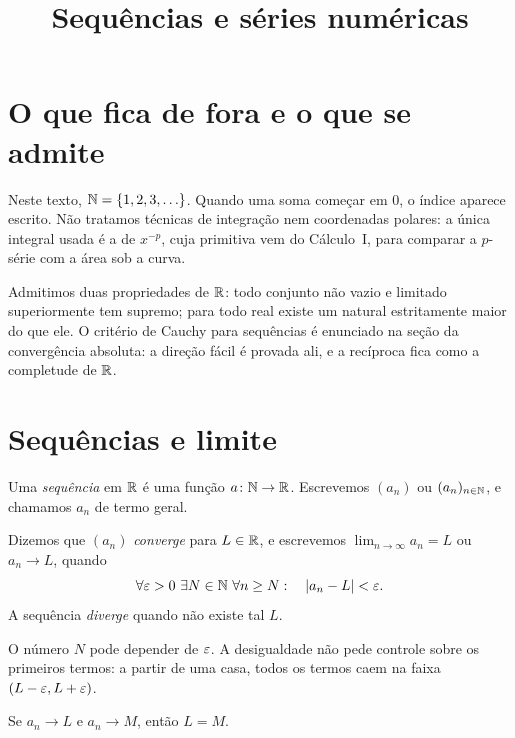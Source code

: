 \documentclass[11pt,a4paper]{article}
\title{Sequências e séries numéricas}
\author{}
\date{}
\begin{document}
\maketitle
\tableofcontents

\section{O que fica de fora e o que se admite}

Neste texto, \(\mathbb{N}=\{1,2,3,\ldots\}\). Quando uma soma começar em \(0\), o índice aparece escrito. Não tratamos técnicas de integração nem coordenadas polares: a única integral usada é a de \(x^{-p}\), cuja primitiva vem do Cálculo~I, para comparar a \(p\)-série com a área sob a curva.

Admitimos duas propriedades de \(\mathbb{R}\): todo conjunto não vazio e limitado superiormente tem supremo; para todo real existe um natural estritamente maior do que ele. O critério de Cauchy para sequências é enunciado na seção da convergência absoluta: a direção fácil é provada ali, e a recíproca fica como a completude de \(\mathbb{R}\).

\section{Sequências e limite}

\begin{definicao}
Uma \emph{sequência} em \(\mathbb{R}\) é uma função \(a\colon\mathbb{N}\to\mathbb{R}\). Escrevemos \((a_n)\) ou \((a_n)_{n\in\mathbb{N}}\), e chamamos \(a_n\) de termo geral.
\end{definicao}

\begin{definicao}
Dizemos que \((a_n)\) \emph{converge} para \(L\in\mathbb{R}\), e escrevemos \(\lim_{n\to\infty}a_n=L\) ou \(a_n\to L\), quando
\[
\forall\eps>0\ \exists N\in\N\ \forall n\ge N:\quad \abs{a_n-L}<\eps.
\]
A sequência \emph{diverge} quando não existe tal \(L\).
\end{definicao}

\begin{intuicao}
O número \(N\) pode depender de \(\varepsilon\). A desigualdade não pede controle sobre os primeiros termos: a partir de uma casa, todos os termos caem na faixa \((L-\varepsilon,L+\varepsilon)\).
\end{intuicao}

\begin{teorema}
Se \(a_n\to L\) e \(a_n\to M\), então \(L=M\).
\end{teorema}
\end{document}
